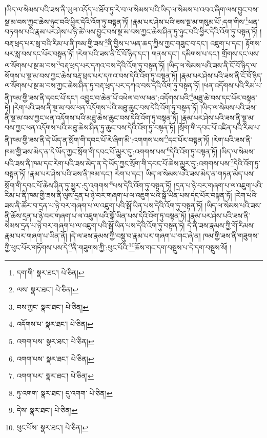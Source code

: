 །ཡིད་ལ་སེམས་པའི་ཟས་ནི་ཡུལ་འདོད་པ་ཐོབ་ཏུ་རེ་བ་ལ་སེམས་པའི་ཡིད་ལ་སེམས་པ་འབའ་ཞིག་ལས་བྱུང་བས་སྔ་མ་བས་ཀྱང་ཆེས་ཉུང་བའི་ཕྱིར་དེའི་འོག་ཏུ་བསྟན་ཏོ། །རྣམ་པར་ཤེས་པའི་ཟས་སྔ་མ་གསུམ་པོ་:དག་གིས་\footnote{དག་གི་  སྣར་ཐང་།  པེ་ཅིན། }ཕན་བཏགས་པའི་རྣམ་པར་ཤེས་པ་ཉི་ཚེ་ལས་བྱུང་བས་སྔ་མ་བས་ཀྱང་ཆེས་ཤིན་ཏུ་ཉུང་བའི་ཕྱིར་དེའི་འོག་ཏུ་བསྟན་ཏོ། །བརྡ་ཕྲད་པར་སླ་བའི་རིམ་པ་ནི་ཁམ་གྱི་ཟས་\footnote{ལས་  སྣར་ཐང་།  པེ་ཅིན། }ནི་བྱིས་པ་ཡན་ཆད་ཀྱིས་ཀྱང་གཟུང་བ་དང་། འཇུག་པ་དང་། རྟོགས་པར་སླ་བས་དང་པོར་བསྟན་ཏོ། །རེག་པའི་ཟས་ནི་ངོ་བོ་ཉིད་དང་། གནས་དང་། དམིགས་པ་དང་། གྲོགས་དང་ལས་ལ་སོགས་པ་སྔ་མ་བས་\footnote{བས་ཀྱང་  སྣར་ཐང་།  པེ་ཅིན། }བརྡ་ཕྲད་པར་དཀའ་བས་དེའི་འོག་ཏུ་བསྟན་ཏོ། །ཡིད་ལ་སེམས་པའི་ཟས་ནི་ངོ་བོ་ཉིད་ལ་སོགས་པ་སྔ་མ་བས་ཀྱང་ཆེས་བརྡ་ཕྲད་པར་དཀའ་བས་དེའི་འོག་ཏུ་བསྟན་ཏོ། །རྣམ་པར་ཤེས་པའི་ཟས་ནི་ངོ་བོ་ཉིད་ལ་སོགས་པ་སྔ་མ་བས་ཀྱང་ཆེས་ཤིན་ཏུ་བརྡ་ཕྲད་པར་དཀའ་བས་དེའི་འོག་ཏུ་བསྟན་ཏོ། །ཕན་འདོགས་པའི་རིམ་པ་ནི་ཁམ་གྱི་ཟས་ནི་དབང་པོ་དང་། འབྱུང་བ་ཆེན་པོ་འཕེལ་བ་ལ་ཕན་:འདོགས་པའི་\footnote{འདོགས་པ་  སྣར་ཐང་།  པེ་ཅིན། }མཐུ་ཆེ་བས་དང་པོར་བསྟན་ཏེ། །རེག་པའི་ཟས་ནི་སྔ་མ་བས་ཕན་འདོགས་པའི་མཐུ་ཆུང་བས་དེའི་འོག་ཏུ་བསྟན་ཏོ། །ཡིད་ལ་སེམས་པའི་ཟས་ནི་སྔ་མ་བས་ཀྱང་ཕན་འདོགས་པའི་མཐུ་ཆེས་ཆུང་བས་དེའི་འོག་ཏུ་བསྟན་ཏོ། །རྣམ་པར་ཤེས་པའི་ཟས་ནི་སྔ་མ་བས་ཀྱང་ཕན་འདོགས་པའི་མཐུ་ཆེས་ཤིན་ཏུ་ཆུང་བས་དེའི་འོག་ཏུ་བསྟན་ཏོ། །སྲོག་གི་དབང་པོ་འཛིན་པའི་རིམ་པ་ནི་ཁམ་གྱི་ཟས་ནི་དེ་ཡོད་ན་སྲོག་གི་དབང་པོ་རེ་ཞིག་མི་:འགགས་པས་\footnote{འགག་པས་  སྣར་ཐང་།  པེ་ཅིན། }དང་པོར་བསྟན་ཏོ། །རེག་པའི་ཟས་ནི་ཁམ་གྱི་ཟས་མེད་ན་དེ་ཡོད་ཀྱང་སྲོག་གི་དབང་པོ་མྱུར་དུ་:འགགས་པས་\footnote{འགག་པས་  སྣར་ཐང་།  པེ་ཅིན། }དེའི་འོག་ཏུ་བསྟན་ཏོ། །ཡིད་ལ་སེམས་པའི་ཟས་ནི་ཁམ་དང་རེག་པའི་ཟས་མེད་ན་དེ་ཡོད་ཀྱང་སྲོག་གི་དབང་པོ་ཆེས་མྱུར་དུ་:འགགས་པས་\footnote{འགག་པར་  སྣར་ཐང་།  པེ་ཅིན། }དེའི་འོག་ཏུ་བསྟན་ཏོ། །རྣམ་པར་ཤེས་པའི་ཟས་ནི་ཁམ་དང་། རེག་པ་དང་། ཡིད་ལ་སེམས་པའི་ཟས་མེད་ན་གཏན་མེད་པས་སྲོག་གི་དབང་པོ་ཆེས་ཤིན་ཏུ་མྱུར་:དུ་འགགས་\footnote{ཏུ་འགག་  སྣར་ཐང་། དུ་འགག་  པེ་ཅིན། }པས་དེའི་འོག་ཏུ་བསྟན་ཏོ། །དྲན་པ་ཉེ་བར་གཞག་པ་ལ་འཇུག་པའི་རིམ་པ་ནི་ཁམ་གྱི་ཟས་ནི་ལུས་དྲན་པ་ཉེ་བར་གཞག་པ་ལ་འཇུག་པའི་སྒོ་ཡིན་པས་དང་པོར་བསྟན་ཏོ། །རེག་པའི་ཟས་ནི་ཚོར་བ་དྲན་པ་ཉེ་བར་གཞག་པ་ལ་འཇུག་པའི་སྒོ་ཡིན་པས་དེའི་འོག་ཏུ་བསྟན་ཏོ། །ཡིད་ལ་སེམས་པའི་ཟས་ནི་ཆོས་དྲན་པ་ཉེ་བར་གཞག་པ་ལ་འཇུག་པའི་སྒོ་ཡིན་པས་དེའི་འོག་ཏུ་བསྟན་ཏོ། །རྣམ་པར་ཤེས་པའི་ཟས་ནི་སེམས་དྲན་པ་ཉེ་བར་གཞག་པ་ལ་འཇུག་པའི་སྒོ་ཡིན་པས་དེའི་འོག་ཏུ་བསྟན་ཏེ། དེ་ནི་ཟས་རྣམས་ཀྱི་གོ་རིམས་རྣམ་པར་གཞག་པ་ཡིན་ནོ། །དེ་ལ་ཟས་རྣམས་ཀྱི་བསྡུ་བ་རྣམ་པར་གཞག་པ་གང་ཞེ་ན། ཁམ་གྱི་ཟས་ནི་གཟུགས་ཀྱི་ཕུང་པོར་གཏོགས་པས་དེ་\footnote{དེས་  སྣར་ཐང་།  པེ་ཅིན། }ནི་གཟུགས་ཀྱི་:ཕུང་པོའི་\footnote{ཕུང་པོས་  སྣར་ཐང་།  པེ་ཅིན། }ཆོས་གང་དག་བསྡུས་པ་དེ་དག་བསྡུས་སོ། །
